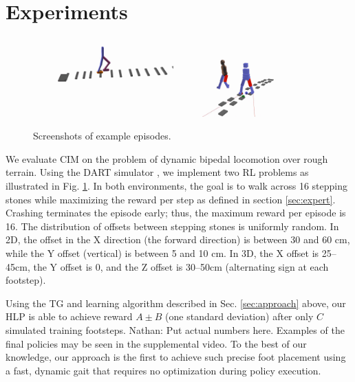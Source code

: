 \documentclass[conference]{IEEEtran}
\newcommand{\nhatch}[1]{{\leavevmode\color{magenta} Nathan: #1}}
\begin{document}
\section{Experiments}

\begin{figure}
  \includegraphics[width=0.48\textwidth]{../figures/2D_ep.png}
  \includegraphics[width=0.48\textwidth]{../figures/3D_ep.png}
  \caption{Screenshots of example episodes.\label{fig:example episodes}}
\end{figure}

We evaluate CIM on the problem of dynamic bipedal locomotion over rough terrain.
Using the DART simulator \citep{lee2018dart}, we implement two RL problems as illustrated in Fig. \ref{fig:example episodes}.
In both environments, the goal is to walk across 16 stepping stones while maximizing the reward per step as defined in section \ref{sec:expert}.
Crashing terminates the episode early;
thus, the maximum reward per episode is 16.
The distribution of offsets between stepping stones is uniformly random.
In 2D, the offset in the X direction (the forward direction) is between 30 and 60 cm, while the Y offset (vertical) is between 5 and 10 cm.
In 3D, the X offset is 25--45cm, the Y offset is 0, and the Z offset is 30--50cm (alternating sign at each footstep).

Using the TG and learning algorithm described in Sec. \ref{sec:approach} above, our HLP is able to achieve reward $A\pm B$ (one standard deviation) after only $C$ simulated training footsteps.
\nhatch{Put actual numbers here.}
Examples of the final policies may be seen in the supplemental video.
To the best of our knowledge, our approach is the first to achieve such precise foot placement
using a fast, dynamic gait that requires no optimization during policy execution.
\end{document}
